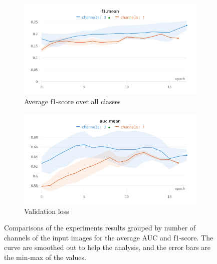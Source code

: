 \documentclass[11pt]{article}
\begin{document}
                \begin{figure}[H]
                     \centering
                     \begin{subfigure}[b]{0.45\textwidth}
                         \centering
                         \includegraphics[width=\textwidth]{plots/channel_comparison_f1}
                         \caption{Average f1-score over all classes}
                         \vspace{4ex}
                         \label{fig:channel_comparison_f1}
                     \end{subfigure}
                     \hfill
                     \begin{subfigure}[b]{0.45\textwidth}
                         \centering
                         \includegraphics[width=\textwidth]{plots/channel_comparison_auc}
                         \caption{Validation loss}
                         \vspace{4ex}
                         \label{fig:channel_comparison_auc}
                     \end{subfigure}

                     \caption{Comparisons of the experiments results grouped by number of channels
                         of the input images for the average AUC and f1-score. The curve are smoothed out to help the analysis, and the error bars are the min-max
                         of the values.}
                \end{figure}
\end{document}
